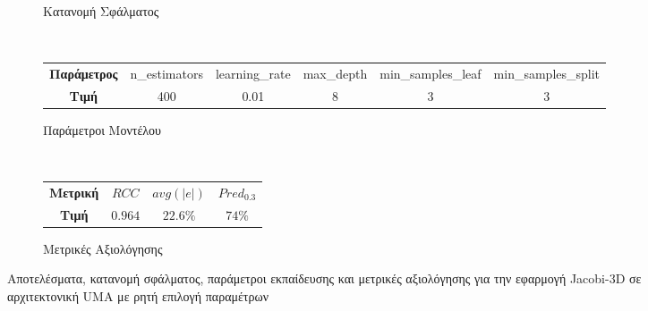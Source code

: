 \begin{figure}[ht]
\begin{subfigure}[b]{0.47\textwidth}
        \caption{Κατανομή Σφάλματος}
    \end{subfigure} 
    \\[0.2cm]
    \begin{subfigure}[b]{\textwidth}
   	 	\scriptsize
		\begin{tabular}{c||c|c|c|c|c}
			\textbf{Παράμετρος} & n\_estimators & learning\_rate & max\_depth & min\_samples\_leaf & min\_samples\_split \\
			\textbf{Τιμή}       &       400        &  0.01               & 8          &  3                  &    3                 
		\end{tabular}
		\caption{Παράμετροι Μοντέλου}
    \end{subfigure}
    \\[0.2cm]
    \begin{subfigure}[b]{\textwidth}
    		\centering
   	 	\scriptsize
		\begin{tabular}{c||c|c|c}
			\textbf{Μετρική} & $RCC$ &   $avg(|e|)$ & $Pred_{0.3}$  \\
			\textbf{Τιμή}  &  $0.964$   &      $22.6\%
			$        &  $74\%$                                         
		\end{tabular}
		\caption{Μετρικές Αξιολόγησης}
    \end{subfigure}
    
        \caption{Αποτελέσματα, κατανομή σφάλματος, παράμετροι εκπαίδευσης και μετρικές αξιολόγησης για την εφαρμογή Jacobi-3D σε αρχιτεκτονική UMA με ρητή επιλογή παραμέτρων}
    \label{fig:NB+cg_avgonly_jacobi_UMA}
\end{figure}

